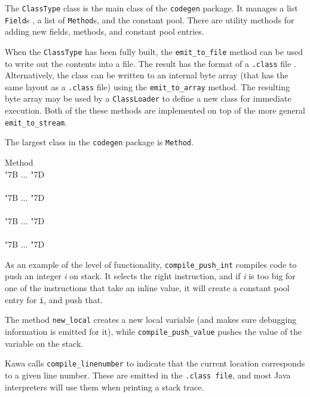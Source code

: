 \documentclass[twocolumn]{article}
\newcommand{\LBr}{\char"7B}
\newcommand{\RBr}{\char"7D}
\begin{document}
The {\tt ClassType} class is the main class of the {\tt codegen} package.
It  manages a list {\tt Field}s , a list of {\tt Method}s,
and the constant pool.
There are utility methods for adding new fields, methods, and constant
pool entries.

When the {\tt ClassType} has been fully built, the \verb|emit_to_file| method
can be used to write out the contents into a file.
The result has the format of a {\tt .class} file \cite{JavaVmSpec}.
Alternatively, the class can be written
to an internal byte array (that has the same layout as a {\tt .class}
file) using the \verb|emit_to_array| method.
The resulting byte array may be used by a {\tt ClassLoader}
to define a new class for immediate execution.
Both of the these methods are implemented on top of the more
general \verb|emit_to_stream|.

The largest class in the {\tt codegen} package is {\tt Method}.

\begin{Class}{Method}{}
\\
{\LBr} ... {\RBr}\\
\\
{\LBr} ... {\RBr}\\
\\
{\LBr} ... {\RBr}\\
\\
{\LBr} ... {\RBr}\\
\end{Class}

As an example of the level of functionality,
\verb|compile_push_int| compiles code to push an integer {\it i} on stack.
It selects the right instruction, and if {\it i} is too
big for one of the instructions that take an inline value,
it will create a constant pool entry for {\tt i},
and push that.

The method {\tt new\_local} creates a new local variable
(and makes sure debugging information is emitted for it),
while {\tt compile\_push\_value} pushes the value of
the variable on the stack.

Kawa calls {\tt compile\_linenumber} to indicate that the current location
corresponds to a given line number.  These are emitted in the
{\tt .class file}, and most Java interpreters will use them
when printing a stack trace.
\end{document}
